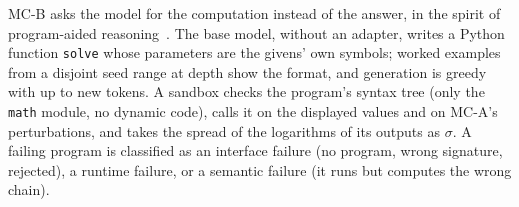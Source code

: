 MC-B asks the model for the computation instead of the answer, in the spirit of program-aided
reasoning~\citep{gao2023pal,chen2023pot}.
The base model, without an adapter, writes a Python function \texttt{solve} whose parameters are the givens' own
symbols;  worked examples from a disjoint seed range at depth  show the format, and
generation is greedy with up to  new tokens.
A sandbox checks the program's syntax tree (only the \texttt{math} module, no dynamic code), calls it on the
displayed values and on MC-A's perturbations, and takes the spread of the logarithms of its outputs as $\sigma$.
A failing program is classified as an interface failure (no program, wrong signature, rejected), a runtime failure,
or a semantic failure (it runs but computes the wrong chain).
